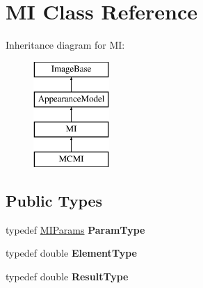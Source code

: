 \hypertarget{classMI}{\section{M\-I Class Reference}
\label{classMI}
}
Inheritance diagram for M\-I\-:\begin{figure}[H]
\begin{center}
\leavevmode
\includegraphics[height=4.000000cm]{classMI}
\end{center}
\end{figure}
\subsection*{Public Types}
\begin{DoxyCompactItemize}
\item 
\hypertarget{classMI_acfdde39ad812bcddf9a54346b1bec7da}{typedef \hyperlink{structMIParams}{M\-I\-Params} {\bfseries Param\-Type}}\label{classMI_acfdde39ad812bcddf9a54346b1bec7da}

\item 
\hypertarget{classMI_abdb72abca1039b20124fb00bc0e23d08}{typedef double {\bfseries Element\-Type}}\label{classMI_abdb72abca1039b20124fb00bc0e23d08}

\item 
\hypertarget{classMI_a78dbfa70dedd8bfac26e7ac73fbde90a}{typedef double {\bfseries Result\-Type}}\label{classMI_a78dbfa70dedd8bfac26e7ac73fbde90a}

\end{DoxyCompactItemize}
